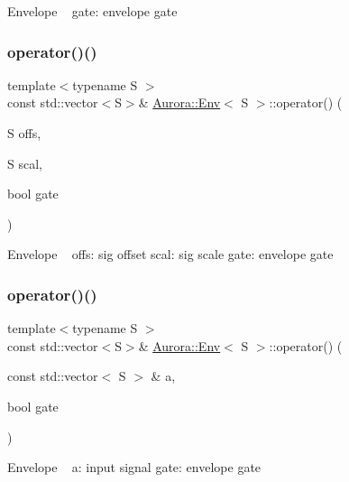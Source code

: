 Envelope ~\newline
gate\+: envelope gate \mbox{\label{class_aurora_1_1_env_a2cf905d912ec6089b42922a92d4d7d5e}} 
\subsubsection{\texorpdfstring{operator()()}{operator()()}\hspace{0.1cm}{\footnotesize\ttfamily [2/3]}}
{\footnotesize\ttfamily template$<$typename S $>$ \\
const std\+::vector$<$S$>$\& \hyperlink{class_aurora_1_1_env}{Aurora\+::\+Env}$<$ S $>$\+::operator() (\begin{DoxyParamCaption}\item[{S}]{offs,  }\item[{S}]{scal,  }\item[{bool}]{gate }\end{DoxyParamCaption})\hspace{0.3cm}{\ttfamily [inline]}}

Envelope ~\newline
offs\+: sig offset scal\+: sig scale gate\+: envelope gate \mbox{\label{class_aurora_1_1_env_a2a97a7e7211a8717957fd0f6f8afc81f}} 
\subsubsection{\texorpdfstring{operator()()}{operator()()}\hspace{0.1cm}{\footnotesize\ttfamily [3/3]}}
{\footnotesize\ttfamily template$<$typename S $>$ \\
const std\+::vector$<$S$>$\& \hyperlink{class_aurora_1_1_env}{Aurora\+::\+Env}$<$ S $>$\+::operator() (\begin{DoxyParamCaption}\item[{const std\+::vector$<$ S $>$ \&}]{a,  }\item[{bool}]{gate }\end{DoxyParamCaption})\hspace{0.3cm}{\ttfamily [inline]}}

Envelope ~\newline
a\+: input signal gate\+: envelope gate \mbox{\label{class_aurora_1_1_env_a6591658018e04100709018bc86e94f31}} 
